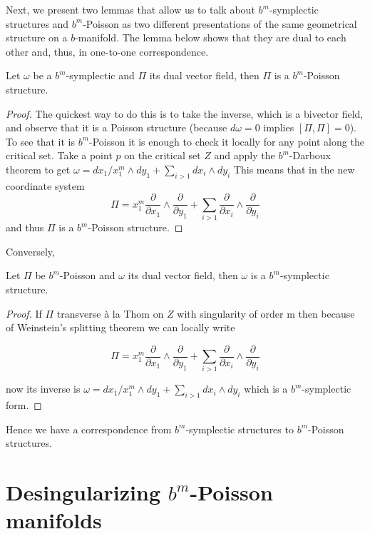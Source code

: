 Next, we present two lemmas that allow us to talk about $b^m$-symplectic structures and $b^m$-Poisson as two different presentations of the same geometrical structure on a $b$-manifold. The lemma below shows that they are dual to each other and, thus, in one-to-one correspondence.


\begin{lemma}
Let $\omega$ be a $b^m$-symplectic and $\Pi$ its dual vector field, then $\Pi$ is a $b^m$-Poisson structure.
\end{lemma}

\begin{proof}
The quickest way to do this is to take the inverse, which is a bivector field, and observe that it is a Poisson structure (because $d\omega=0$ implies $[\Pi, \Pi]=0$). To see that it is $b^m$-Poisson
it is enough to check it locally for any point along the critical set. Take a point $p$ on the critical set $Z$ and apply the $b^m$-Darboux theorem  to get $\omega= dx_1/x_1^m\wedge dy_1+ \sum_{i>1} dx_i\wedge dy_i$
This means that in the new coordinate system $$\Pi=x_1^m\frac{\partial}{\partial x_1}\wedge \frac{\partial}{\partial y_1}+\sum_{i>1} \frac{\partial}{\partial x_i}\wedge \frac{\partial}{\partial y_i}$$
and thus $\Pi$ is a $b^m$-Poisson structure.

\end{proof}


Conversely,
\begin{lemma}
Let $\Pi$ be $b^m$-Poisson and $\omega$ its dual vector field, then $\omega$ is a $b^m$-symplectic structure.
\end{lemma}


\begin{proof}
 If $\Pi$ transverse à la Thom on $Z$ with singularity of order m then because of Weinstein's splitting theorem we can locally write

$$\Pi=x_1^m\frac{\partial}{\partial x_1}\wedge \frac{\partial}{\partial y_1}+\sum_{i>1} \frac{\partial}{\partial x_i}\wedge \frac{\partial}{\partial y_i}$$

now its inverse is $\omega= dx_1/x_1^m\wedge dy_1+ \sum_{i>1} dx_i\wedge dy_i$  which is a $b^m$-symplectic form.
\end{proof}

Hence we have a correspondence from $b^m$-symplectic structures to $b^m$-Poisson structures.



\section{{Desingularizing $b^m$-Poisson manifolds}}\label{sec:deblogging}

